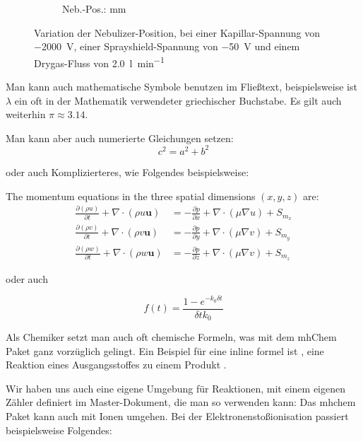 \begin{figure}
\begin{center}
\begin{subfigure}{0.45\columnwidth}
			\caption{Neb.-Pos.: \unit[13,5]{mm}}
			\label{nebuPos_01_17.7}
		\end{subfigure}
   		\caption[Variation der Nebulizer-Position]{Variation der Nebulizer-Position, bei einer Kapillar-Spannung von \SI{-2000}{V}, einer Sprayshield-Spannung von \SI{-50}{V} und einem Drygas-Fluss von \SI{2,0}{l min^{-1}} }
   		\label{fig:nebuPos_01_nebuPosVari}
   \end{center}
\end{figure} 

Man kann auch mathematische Symbole benutzen im Fließtext, beispielsweise ist $\lambda$ ein oft in der Mathematik verwendeter griechischer Buchstabe. Es gilt auch weiterhin $\pi \approx 3.14$. 

Man kann aber auch numerierte Gleichungen setzen: 
\begin{equation}
c^2 = a^2 + b^2
\end{equation}

oder auch Komplizierteres, wie Folgendes beispielsweise: 

The momentum equations in the three spatial dimensions $(x,y,z)$ are: 
\begin{eqnarray}
\frac{\partial(\rho u)}{\partial t}+\nabla\cdot(\rho u \mathbf{u}) & = -\frac{\partial p}{\partial x} + \nabla\cdot(\mu \nabla u) + S_{m_x} \\
\frac{\partial(\rho v)}{\partial t}+\nabla\cdot(\rho v \mathbf{u}) & = -\frac{\partial p}{\partial y} + \nabla\cdot(\mu \nabla v) + S_{m_y} \\ 
\frac{\partial(\rho w)}{\partial t}+\nabla\cdot(\rho w \mathbf{u}) & = -\frac{\partial p}{\partial z} + \nabla\cdot(\mu \nabla v) + S_{m_z} 
\end{eqnarray}

oder auch 

\begin{equation}\label{eqn:avg-viscous-damping-function}
f(t) = \frac{1-e^{-k_0 \delta t}} {\delta t k_0}
\end{equation}

Als Chemiker setzt man auch oft chemische Formeln, was mit dem mhChem Paket ganz vorzüglich gelingt. Ein Beispiel für eine inline formel ist , eine Reaktion eines Ausgangsstoffes  zu einem Produkt .

Wir haben uns auch eine eigene Umgebung für Reaktionen, mit einem eigenen Zähler definiert im Master-Dokument, die man so verwenden kann: 
Das mhchem Paket kann auch mit Ionen umgehen. Bei der Elektronenstoßionisation passiert beispielsweise Folgendes: 

